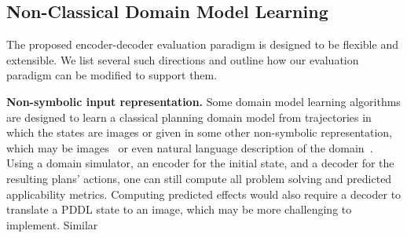 \documentclass{article}
\newcommand{\miniparagraph}[1]{\textbf{#1.}}
\theoremstyle{definition}
\theoremstyle{remark}
\newif\ifaddcomments
\newcommand{\roni}[1]{\ifaddcomments{\textcolor{red}{[Roni: #1]}}\fi}
\newcommand{\yarin}[1]{\ifaddcomments{\textcolor{teal}{[Yarin: #1]}}\fi}
\begin{document}






\subsection{Non-Classical Domain Model Learning}
The proposed encoder-decoder evaluation paradigm is designed to be flexible and extensible. 
We list several such directions and outline how our evaluation paradigm can be modified to support them. 

\miniparagraph{Non-symbolic input representation}
Some domain model learning algorithms are designed to learn a classical planning domain model from trajectories in which the states are images or given in some other non-symbolic representation, which may be images~\citep{asai2020learning,asai2022classical,xi2024neuro} or even natural language description of the domain~\cite{lindsay2017framer}.\roni{Maybe some recent LLM-based approach?} 
Using a domain simulator, an encoder for the initial state, and a decoder for the resulting plans' actions, one can still compute all problem solving and predicted applicability metrics. 
Computing predicted effects would also require a decoder to translate a PDDL state to an image, which may be more challenging to implement. 
Similar
\end{document}
